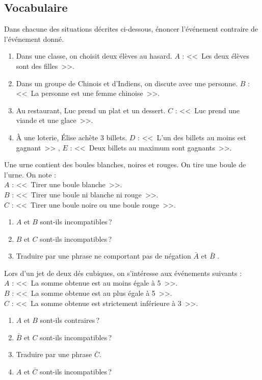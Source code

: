 \subsection*{Vocabulaire}
\begin{exo}\label{exo:proba-1}
Dans chacune des situations décrites ci-dessous, énoncer l’événement contraire de l’événement donné.
\begin{enumerate}
\item Dans une classe, on choisit deux élèves au hasard. $A$ : <<~Les deux élèves sont des filles~>>.
\item Dans un groupe de Chinois et d'Indiens, on discute avec une personne. $B$ : <<~La personne est une femme chinoise~>>.
\item Au restaurant, Luc prend un plat et un dessert. $C$ : <<~Luc prend une viande et une glace~>>.
\item À une loterie, Élise achète 3 billets.
      $D$ : <<~L’un des billets au moins est gagnant~>> , $E$ : <<~Deux billets au maximum sont gagnants~>>.
\end{enumerate}
\end{exo}
%
\begin{exo}\label{exo:proba-2}
Une urne contient des boules blanches, noires et rouges. On tire une boule de l’urne. On note : \\
$A$ : <<~Tirer une boule blanche~>>.                  \\
$B$ : <<~Tirer une boule ni blanche ni rouge~>>.      \\
$C$ : <<~Tirer une boule noire ou une boule rouge~>>. 
\begin{enumerate}
\item $A$ et $B$ sont-ils incompatibles\,?
\item $B$ et $C$ sont-ils incompatibles\,?
\item Traduire par une phrase ne comportant pas de négation $\bar{A}$ et $\bar{B}$ .
\end{enumerate}
\end{exo}
%
\begin{exo}\label{exo:proba-3}
Lors d’un jet de deux dés cubiques, on s’intéresse aux événements suivants : \\
$A$ : <<~La somme obtenue est au moins égale à 5~>>.                  \\
$B$ : <<~La somme obtenue est au plus égale à 5~>>.                   \\
$C$ : <<~La somme obtenue est strictement inférieure à 3~>>. 
\begin{enumerate}
\item $A$ et $B$ sont-ils contraires\,?
\item $\bar{B}$ et $C$ sont-ils incompatibles\,?
\item Traduire par une phrase $\bar{C}$.
\item $A$ et $\bar{C}$ sont-ils incompatibles\,?
\end{enumerate}
\end{exo}
%
